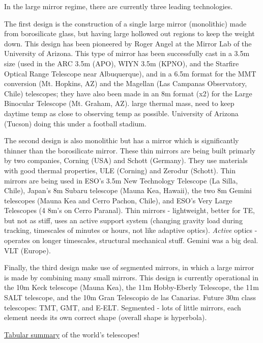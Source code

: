 \documentclass[12pt]{article}
\newcommand{\mynotes}[1]{\textcolor{myBlue}{#1}}
\begin{document}
In the large mirror regime, there are currently three leading technologies.
\begin{description}
    \item [Borosilicate honeycomb]
        The first design is the construction of a single large mirror
        (monolithic) made from borosilicate glass, but having large hollowed
        out regions to keep the weight down. This
        design has been pioneered by Roger Angel at the Mirror Lab of the
        University of Arizona. This type of mirror has been successfully cast
        in a 3.5m size (used in the ARC 3.5m (APO), WIYN 3.5m (KPNO), and the
        Starfire Optical Range Telescope near Albuquerque), and in a 6.5m
        format for the MMT conversion (Mt. Hopkins, AZ) and the Magellan (Las
        Campanas Observatory, Chile) telescopes; they have also been made in
        an 8m format (x2) for the Large Binocular Telescope (Mt. Graham, AZ).
        \mynotes{%
        large thermal mass, need to keep daytime temp as close to observing
        temp as possible. University of Arizona (Tucson) doing this under a
        football stadium.}
    \item [Thin mirrors]
        The second design is also monolithic but has a mirror which is
        significantly thinner than the borosilicate mirror. These thin mirrors
        are being built primarly by two companies, Corning (USA) and Schott
        (Germany). They use materials with good thermal properties, ULE
        (Corning) and Zerodur (Schott). Thin mirrors are being used in ESO's
        3.5m New Technology Telescope (La Silla, Chile), Japan's 8m Subaru
        telescope (Mauna Kea, Hawaii), the two 8m Gemini telescopes (Mauna Kea
        and Cerro Pachon, Chile), and ESO's Very Large Telescopes (4 8m's on
        Cerro Paranal).
        \mynotes{Thin mirrors - lightweight, better for TE, but not as stiff, uses
        an active support system (changing gravity load during tracking,
        timescales of minutes or hours, not like adaptive optics).
        \emph{Active} optics - operates on longer timescales, structural
        mechanical stuff. Gemini was a big deal. VLT (Europe).}
    \item Finally, the third design make use of segmented mirrors, in which a
        large mirror is made by combining many small mirrors. This design is
        currently operational in the 10m Keck telescope (Mauna Kea), the 11m
        Hobby-Eberly Telescope, the 11m SALT telescope, and the 10m Gran
        Telescopio de las Canarias. Future 30m class telescopes: TMT, GMT, and
        E-ELT.
        \mynotes{Segmented - lots of little mirrors, each element needs its own
        correct shape (overall shape is hyperbola).}
\end{description}
\href{http://astro.nineplanets.org/bigeyes.html}{Tabular summary}
of the world's telescopes!
\end{document}
